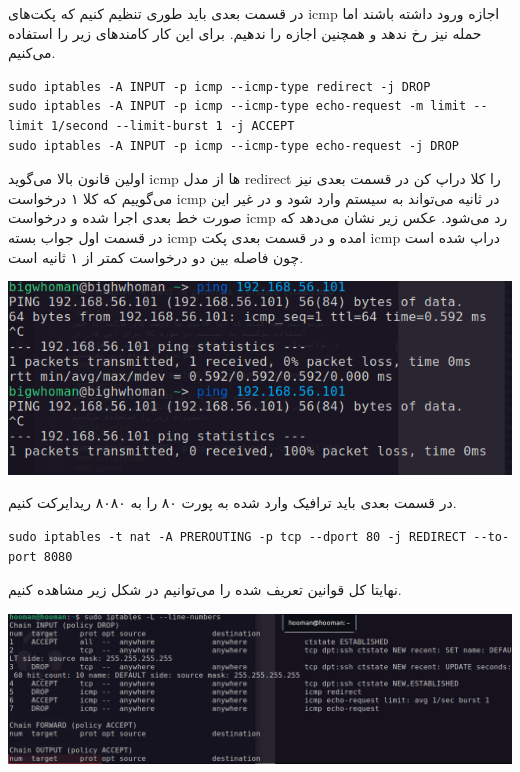 در قسمت بعدی باید طوری تنظیم کنیم که پکت‌های icmp اجازه ورود داشته باشند اما حمله 
 نیز 
رخ ندهد و همچنین اجازه  را ندهیم.
برای این کار کامندهای زیر را استفاده می‌کنیم.
\begin{latin}   
\begin{lstlisting}
sudo iptables -A INPUT -p icmp --icmp-type redirect -j DROP
sudo iptables -A INPUT -p icmp --icmp-type echo-request -m limit --limit 1/second --limit-burst 1 -j ACCEPT
sudo iptables -A INPUT -p icmp --icmp-type echo-request -j DROP
\end{lstlisting}
\end{latin}
اولین قانون بالا می‌گوید icmp ها از مدل redirect را کلا دراپ کن 
در قسمت بعدی نیز می‌گوییم که کلا ۱ درخواست icmp در ثانیه می‌تواند به سیستم وارد شود و در غیر این صورت 
خط بعدی اجرا شده و درخواست icmp رد می‌شود. 
عکس زیر نشان می‌دهد که در قسمت اول جواب بسته icmp امده و در قسمت 
بعدی پکت icmp دراپ شده است چون فاصله بین دو درخواست کمتر از ۱ ثانیه است.
\begin{center}
    \includegraphics[scale=0.35]{pics/iptables4.png}
\end{center}
در قسمت بعدی باید ترافیک وارد شده به پورت ۸۰ را به ۸۰۸۰ ریدایرکت کنیم.
\begin{latin}   
\begin{lstlisting}
sudo iptables -t nat -A PREROUTING -p tcp --dport 80 -j REDIRECT --to-port 8080
\end{lstlisting}
\end{latin}
نهایتا کل قوانین تعریف شده را می‌توانیم در شکل زیر مشاهده کنیم.
\begin{center}
    \includegraphics[scale=0.30]{pics/iptables5.png}
\end{center}